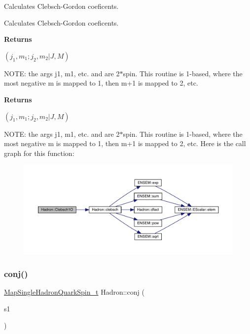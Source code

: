 Calculates Clebsch-\/\+Gordon coeficents. 

Calculates Clebsch-\/\+Gordon coeficents.

{\bfseries{ Returns }}

$\left(j_1,m_1;j_2,m_2|J,M\right) $

N\+O\+TE\+: the args j1, m1, etc. and are 2$\ast$spin. This routine is 1-\/based, where the most negative m is mapped to 1, then m+1 is mapped to 2, etc.

{\bfseries{ Returns }}

$\left(j_1,m_1;j_2,m_2|J,M\right) $

N\+O\+TE\+: the args j1, m1, etc. and are 2$\ast$spin. This routine is 1-\/based, where the most negative m is mapped to 1, then m+1 is mapped to 2, etc. Here is the call graph for this function\+:
\nopagebreak
\begin{figure}[H]
\begin{center}
\leavevmode
\includegraphics[width=350pt]{d1/daf/namespaceHadron_a78e0e843ad34636504d3ab3f2280e5e5_cgraph}
\end{center}
\end{figure}
\mbox{\label{namespaceHadron_a5b62c8e194d4e04483d980199eff43fa}} 
\subsubsection{\texorpdfstring{conj()}{conj()}\hspace{0.1cm}{\footnotesize\ttfamily [1/3]}}
{\footnotesize\ttfamily \mbox{\hyperlink{namespaceHadron_a22279e56b59508dc8dd2c8991dc911fd}{Map\+Single\+Hadron\+Quark\+Spin\+\_\+t}} Hadron\+::conj (\begin{DoxyParamCaption}\item[{const \mbox{\hyperlink{namespaceHadron_a22279e56b59508dc8dd2c8991dc911fd}{Map\+Single\+Hadron\+Quark\+Spin\+\_\+t}} \&}]{s1 }\end{DoxyParamCaption})}



